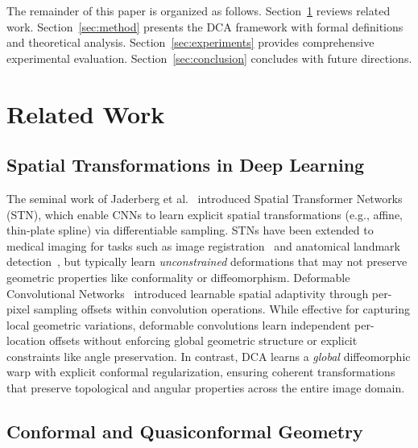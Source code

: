 \documentclass[10pt,journal,compsoc]{IEEEtran}
\begin{document}
The remainder of this paper is organized as follows. Section~\ref{sec:related} reviews related work. Section~\ref{sec:method} presents the DCA framework with formal definitions and theoretical analysis. Section~\ref{sec:experiments} provides comprehensive experimental evaluation. Section~\ref{sec:conclusion} concludes with future directions.

\section{Related Work}
\label{sec:related}

\subsection{Spatial Transformations in Deep Learning}

The seminal work of Jaderberg et al.~\cite{jaderberg2015spatial} introduced Spatial Transformer Networks (STN), which enable CNNs to learn explicit spatial transformations (e.g., affine, thin-plate spline) via differentiable sampling. STNs have been extended to medical imaging for tasks such as image registration~\cite{balakrishnan2019voxelmorph} and anatomical landmark detection~\cite{payer2019integrating}, but typically learn \textit{unconstrained} deformations that may not preserve geometric properties like conformality or diffeomorphism. Deformable Convolutional Networks~\cite{dai2017deformable,zhu2019deformable} introduced learnable spatial adaptivity through per-pixel sampling offsets within convolution operations. While effective for capturing local geometric variations, deformable convolutions learn independent per-location offsets without enforcing global geometric structure or explicit constraints like angle preservation. In contrast, DCA learns a \textit{global} diffeomorphic warp with explicit conformal regularization, ensuring coherent transformations that preserve topological and angular properties across the entire image domain.

\subsection{Conformal and Quasiconformal Geometry}
\end{document}
